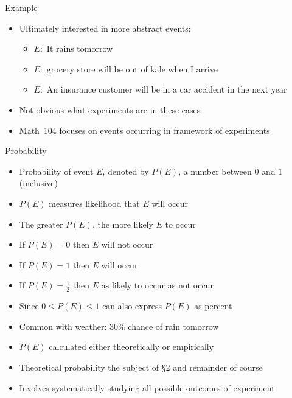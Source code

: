 \documentclass{beamer}
\theoremstyle{definition}
\begin{document}
\begin{frame}{Example}
\begin{itemize}
\item Ultimately interested in more abstract events:
\begin{itemize}
\item $E:$ It rains tomorrow
\item $E:$ grocery store will be out of kale when I arrive
\item $E:$ An insurance customer will be in a car accident in the next year
\end{itemize}
\item Not obvious what experiments are in these cases
\item Math~104 focuses on events occurring in framework of experiments
\end{itemize}
\end{frame}

\begin{frame}{Probability}
\begin{itemize}
\item \alert{Probability of event $E$}, denoted by $P\left(E\right)$,
a number between $0$ and $1$ (inclusive)
\item $P\left(E\right)$ measures likelihood that $E$ will occur
\item The greater $P\left(E\right)$, the more likely $E$ to occur
\item If $P\left(E\right)=0$ then $E$ will not occur
\item If $P\left(E\right)=1$ then $E$ will occur
\item If $P\left(E\right)=\frac{1}{2}$ then $E$ 
as likely to occur as not occur
\item Since $0\le P\left(E\right)\le 1$ can also express
$P\left(E\right)$ as percent
\item Common with weather: \alert{$30\%$ chance of rain tomorrow}
\item $P\left(E\right)$ calculated either \alert{theoretically}
or \alert{empirically}
\item Theoretical probability the subject of \S2 and remainder of course
\item Involves systematically studying all possible outcomes of experiment
\end{itemize}
\end{frame}
\end{document}
